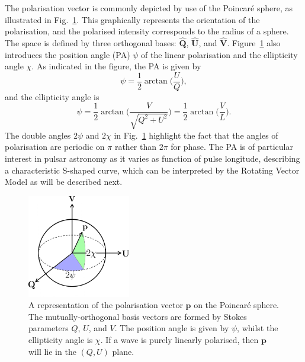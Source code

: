The polarisation vector is commonly depicted by use of the Poincar\'e sphere, as illustrated in Fig.~\ref{fig: intro - Poincare sphere}. This graphically represents the orientation of the polarisation, and the polarised intensity corresponds to the radius of a sphere. The space is defined by three orthogonal bases: $\hat{\mathbf{Q}}$, $\hat{\mathbf{U}}$, and $\hat{\mathbf{V}}$. Figure~\ref{fig: intro - Poincare sphere} also introduces the position angle (PA) $\psi$ of the linear polarisation and the ellipticity angle $\chi$. As indicated in the figure, the PA is given by
\begin{equation}
    \label{eq: position angle definition}
    \psi = \frac{1}{2}\arctan\bigg(\frac{U}{Q}\bigg),
\end{equation}
and the ellipticity angle is 
\begin{equation}
    \label{eq: ellipticity angle definition}
    \psi = \frac{1}{2}\arctan\bigg(\frac{V}{\sqrt{Q^2 + U^2}}\bigg) = \frac{1}{2}\arctan\bigg(\frac{V}{L}\bigg).
\end{equation}
The double angles $2\psi$ and $2\chi$ in Fig.~\ref{fig: intro - Poincare sphere} highlight the fact that the angles of polarisation are periodic on $\pi$ rather than $2\pi$ for phase. The PA is of particular interest in pulsar astronomy as it varies as function of pulse longitude, describing a characteristic S-shaped curve, which can be interpreted by the Rotating Vector Model as will be described next.
\begin{figure}
    \begin{center}
        \includegraphics[width=0.4\textwidth]{Figures/Introduction/poincare_sphere}
        \caption[Polarisation vector on the Poincar\'e sphere]{A representation of the polarisation vector $\mathbf{p}$ on the Poincar\'e sphere. The mutually-orthogonal basis vectors are formed by Stokes parameters $Q$, $U$, and $V$. The position angle is given by $\psi$, whilst the ellipticity angle is $\chi$. If a wave is purely linearly polarised, then $\mathbf{p}$ will lie in the $(Q,U)$ plane.}
        \label{fig: intro - Poincare sphere}
    \end{center}
\end{figure}

